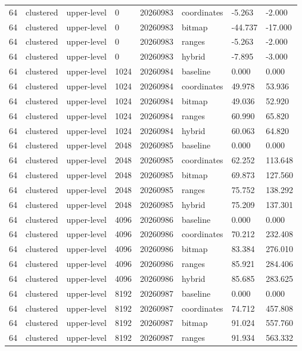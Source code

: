 \begin{tabular}{llllllll}
64 & clustered & upper-level & 0 & 20260983 & coordinates & -5.263 & -2.000 \\
64 & clustered & upper-level & 0 & 20260983 & bitmap & -44.737 & -17.000 \\
64 & clustered & upper-level & 0 & 20260983 & ranges & -5.263 & -2.000 \\
64 & clustered & upper-level & 0 & 20260983 & hybrid & -7.895 & -3.000 \\
64 & clustered & upper-level & 1024 & 20260984 & baseline & 0.000 & 0.000 \\
64 & clustered & upper-level & 1024 & 20260984 & coordinates & 49.978 & 53.936 \\
64 & clustered & upper-level & 1024 & 20260984 & bitmap & 49.036 & 52.920 \\
64 & clustered & upper-level & 1024 & 20260984 & ranges & 60.990 & 65.820 \\
64 & clustered & upper-level & 1024 & 20260984 & hybrid & 60.063 & 64.820 \\
64 & clustered & upper-level & 2048 & 20260985 & baseline & 0.000 & 0.000 \\
64 & clustered & upper-level & 2048 & 20260985 & coordinates & 62.252 & 113.648 \\
64 & clustered & upper-level & 2048 & 20260985 & bitmap & 69.873 & 127.560 \\
64 & clustered & upper-level & 2048 & 20260985 & ranges & 75.752 & 138.292 \\
64 & clustered & upper-level & 2048 & 20260985 & hybrid & 75.209 & 137.301 \\
64 & clustered & upper-level & 4096 & 20260986 & baseline & 0.000 & 0.000 \\
64 & clustered & upper-level & 4096 & 20260986 & coordinates & 70.212 & 232.408 \\
64 & clustered & upper-level & 4096 & 20260986 & bitmap & 83.384 & 276.010 \\
64 & clustered & upper-level & 4096 & 20260986 & ranges & 85.921 & 284.406 \\
64 & clustered & upper-level & 4096 & 20260986 & hybrid & 85.685 & 283.625 \\
64 & clustered & upper-level & 8192 & 20260987 & baseline & 0.000 & 0.000 \\
64 & clustered & upper-level & 8192 & 20260987 & coordinates & 74.712 & 457.808 \\
64 & clustered & upper-level & 8192 & 20260987 & bitmap & 91.024 & 557.760 \\
64 & clustered & upper-level & 8192 & 20260987 & ranges & 91.934 & 563.332 \\

\end{tabular}
